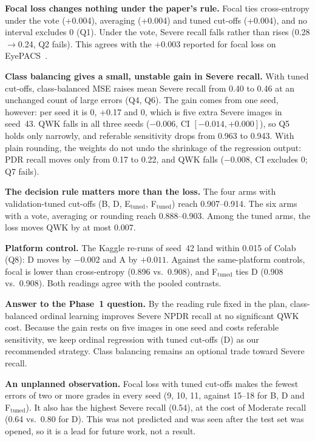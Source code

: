 \textbf{Focal loss changes nothing under the paper's rule.} Focal ties cross-entropy under the vote (+0.004),
averaging (+0.004) and tuned cut-offs (+0.004), and no interval excludes 0 (Q1). Under the vote, Severe recall
falls rather than rises (0.28$\to$0.24, Q2 fails). This agrees with the +0.003 reported for focal loss on
EyePACS~\cite{huang2023resnet}.

\textbf{Class balancing gives a small, unstable gain in Severe recall.} With tuned cut-offs, class-balanced MSE
raises mean Severe recall from 0.40 to 0.46 at an unchanged count of large errors (Q4, Q6). The gain comes from one
seed, however: per seed it is 0, +0.17 and 0, which is five extra Severe images in seed~43. QWK falls in all three
seeds ($-0.006$, CI $[-0.014, +0.000]$), so Q5 holds only narrowly, and referable sensitivity drops from 0.963 to
0.943. With plain rounding, the weights do not undo the shrinkage of the regression output: PDR recall moves only
from 0.17 to 0.22, and QWK falls ($-0.008$, CI excludes 0; Q7 fails).

\textbf{The decision rule matters more than the loss.} The four arms with validation-tuned cut-offs (B, D,
E$_\text{tuned}$, F$_\text{tuned}$) reach 0.907--0.914. The six arms with a vote, averaging or rounding reach
0.888--0.903. Among the tuned arms, the loss moves QWK by at most 0.007.

\textbf{Platform control.} The Kaggle re-runs of seed~42 land within 0.015 of Colab (Q8): D moves by $-0.002$ and
A by $+0.011$. Against the same-platform controls, focal is lower than cross-entropy (0.896 vs.\ 0.908), and
F$_\text{tuned}$ ties D (0.908 vs.\ 0.908). Both readings agree with the pooled contrasts.

\textbf{Answer to the Phase~1 question.} By the reading rule fixed in the plan, class-balanced ordinal learning
improves Severe NPDR recall at no significant QWK cost. Because the gain rests on five images in one seed and costs
referable sensitivity, we keep ordinal regression with tuned cut-offs (D) as our recommended strategy. Class
balancing remains an optional trade toward Severe recall.

\textbf{An unplanned observation.} Focal loss with tuned cut-offs makes the fewest errors of two or more grades in
every seed (9, 10, 11, against 15--18 for B, D and F$_\text{tuned}$). It also has the highest Severe recall (0.54),
at the cost of Moderate recall (0.64 vs.\ 0.80 for D). This was not predicted and was seen after the test set was
opened, so it is a lead for future work, not a result.
